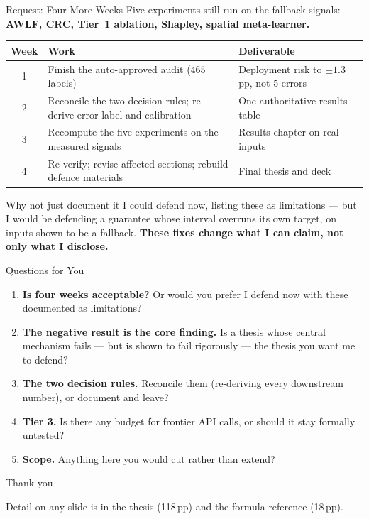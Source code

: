 \documentclass[aspectratio=169,11pt]{beamer}
\begin{document}
\begin{frame}{Request: Four More Weeks}
\small
Five experiments still run on the fallback signals: \textbf{AWLF, CRC, Tier~1 ablation, Shapley, spatial meta-learner.}
\vspace{0.5mm}
\begin{center}
\scriptsize
\renewcommand{\arraystretch}{0.95}
\begin{tabular}{@{}c p{5.8cm} p{5.2cm}@{}}
\toprule
\textbf{Week} & \textbf{Work} & \textbf{Deliverable} \\
\midrule
1 & Finish the auto-approved audit ($465$ labels) & Deployment risk to $\pm1.3$ pp, not $5$ errors \\
2 & Reconcile the two decision rules; re-derive error label and calibration & One authoritative results table \\
3 & Recompute the five experiments on the measured signals & Results chapter on real inputs \\
4 & Re-verify; revise affected sections; rebuild defence materials & Final thesis and deck \\
\bottomrule
\end{tabular}
\end{center}
\vspace{-2mm}
\begin{alertblock}{\small Why not just document it}
\footnotesize I could defend now, listing these as limitations --- but I would be defending a guarantee whose interval overruns its own target, on inputs shown to be a fallback. \textbf{These fixes change what I can claim, not only what I disclose.}
\end{alertblock}
\end{frame}

\begin{frame}{Questions for You}
\begin{enumerate}
  \setlength\itemsep{4mm}
  \item \textbf{Is four weeks acceptable?} Or would you prefer I defend now with these documented as limitations?
  \item \textbf{The negative result is the core finding.} Is a thesis whose central mechanism fails --- but is shown to fail rigorously --- the thesis you want me to defend?
  \item \textbf{The two decision rules.} Reconcile them (re-deriving every downstream number), or document and leave?
  \item \textbf{Tier 3.} Is there any budget for frontier API calls, or should it stay formally untested?
  \item \textbf{Scope.} Anything here you would cut rather than extend?
\end{enumerate}
\end{frame}

\begin{frame}[standout]
Thank you
\vspace{4mm}

{\normalsize Detail on any slide is in the thesis (118\,pp) and the formula reference (18\,pp).}
\end{frame}
\end{document}
